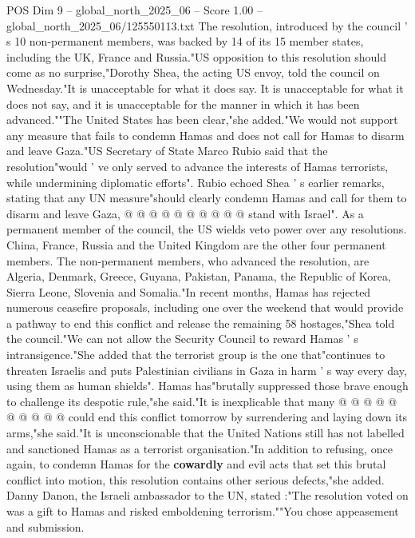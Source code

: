 \begin{textsample}{POS Dim 9 – global\_north\_2025\_06 – Score 1.00 – global\_north\_2025\_06/125550113.txt}  \label{ex:f9_pos_379}
The resolution, introduced by the council ' s 10 non-permanent members, was backed by 14 of its 15 member states, including the UK, France and Russia."US opposition to this resolution should come as no surprise,"Dorothy Shea, the acting US envoy, told the council on Wednesday."It is unacceptable for what it does say.
It is unacceptable for what it does not say, and it is unacceptable for the manner in which it has been advanced.""The United States has been clear,"she added."We would not support any measure that fails to condemn Hamas and does not call for Hamas to disarm and leave Gaza."US Secretary of State Marco Rubio said that the resolution"would ' ve only served to advance the interests of Hamas terrorists, while undermining diplomatic efforts".
Rubio echoed Shea ' s earlier remarks, stating that any UN measure"should clearly condemn Hamas and call for them to disarm and leave Gaza, @ @ @ @ @ @ @ @ @ @ stand with Israel".
As a permanent member of the council, the US wields veto power over any resolutions.
China, France, Russia and the United Kingdom are the other four permanent members.
The non-permanent members, who advanced the resolution, are Algeria, Denmark, Greece, Guyana, Pakistan, Panama, the Republic of Korea, Sierra Leone, Slovenia and Somalia."In recent months, Hamas has rejected numerous ceasefire proposals, including one over the weekend that would provide a pathway to end this conflict and release the remaining 58 hostages,"Shea told the council."We can not allow the Security Council to reward Hamas ' s intransigence."She added that the terrorist group is the one that"continues to threaten Israelis and puts Palestinian civilians in Gaza in harm ' s way every day, using them as human shields".
Hamas has"brutally suppressed those brave enough to challenge its despotic rule,"she said."It is inexplicable that many @ @ @ @ @ @ @ @ @ @ could end this conflict tomorrow by surrendering and laying down its arms,"she said."It is unconscionable that the United Nations still has not labelled and sanctioned Hamas as a terrorist organisation."In addition to refusing, once again, to condemn Hamas for the \textbf{cowardly} and evil acts that set this brutal conflict into motion, this resolution contains other serious defects,"she added.
Danny Danon, the Israeli ambassador to the UN, stated :"The resolution voted on was a gift to Hamas and risked emboldening terrorism.""You chose appeasement and submission.

\end{textsample}
